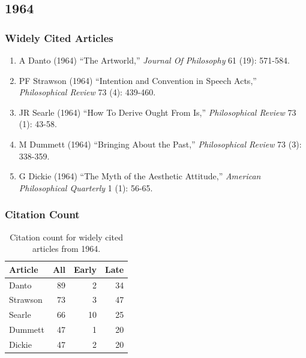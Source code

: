 \documentclass[
  10pt,
  letterpaper,
  DIV=11,
  numbers=noendperiod,
  twoside]{scrartcl}
\providecommand{\tightlist}{%
  \setlength{\itemsep}{0pt}\setlength{\parskip}{0pt}}\usepackage{longtable,booktabs,array}
\begin{document}
\newpage

\subsection{1964}\label{sec-s1964}

\subsubsection*{Widely Cited Articles}\label{widely-cited-articles-8}

\begin{enumerate}
\def\labelenumi{\arabic{enumi}.}
\tightlist
\item
  A Danto (1964) ``The Artworld,'' \emph{Journal Of Philosophy} 61 (19):
  571-584.
\item
  PF Strawson (1964) ``Intention and Convention in Speech Acts,''
  \emph{Philosophical Review} 73 (4): 439-460.
\item
  JR Searle (1964) ``How To Derive Ought From Is,'' \emph{Philosophical
  Review} 73 (1): 43-58.
\item
  M Dummett (1964) ``Bringing About the Past,'' \emph{Philosophical
  Review} 73 (3): 338-359.
\item
  G Dickie (1964) ``The Myth of the Aesthetic Attitude,'' \emph{American
  Philosophical Quarterly} 1 (1): 56-65.
\end{enumerate}

\subsubsection*{Citation Count}\label{sec-count-1964}

\begin{longtable}[]{@{}lrrr@{}}

\caption{\label{tbl-citation-count-1964}Citation count for widely cited
articles from 1964.}

\tabularnewline

\toprule\noalign{}
Article & All & Early & Late \\
\midrule\noalign{}
\endhead
\bottomrule\noalign{}
\endlastfoot
Danto & 89 & 2 & 34 \\
Strawson & 73 & 3 & 47 \\
Searle & 66 & 10 & 25 \\
Dummett & 47 & 1 & 20 \\
Dickie & 47 & 2 & 20 \\

\end{longtable}
\end{document}
